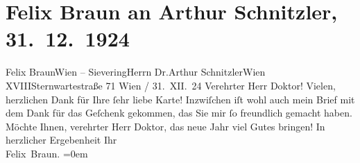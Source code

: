 

         
         \renewcommand{\erwaehntePersonen}{Personen: Felix Braun}
         \renewcommand{\erwaehnteOrte}{Orte: Sievering, Sternwartestraße, Wien, XVI., Ottakring, XVIII., Währing}
         \renewcommand{\erwaehnteWerke}{Werke: Fräulein Else}
               \section[Felix Braun an Arthur Schnitzler, 31. 12. 1924]{ Felix Braun an Arthur Schnitzler, 31. 12. 1924}\nopagebreak{}\rehead{ }\begin{ledgroupsized}[t]{13cm}\normalsize\beginnumbering \toendnotes[C]{\smallbreak\pagebreak[2]} 
\toendnotes[C]{\smallbreak}\pstart{}{\pb}Felix Braun\pend{}\pstart{}Wien – Sievering\pend{}{\bigskip}\pstart{}Herrn Dr.\pend{}\pstart{}Arthur Schnitzler\pend{}\pstart{}Wien XVIII\pend{}\pstart{}Sternwartestraße 71\pend{}{\bigskip}\pstart
           \centering{}{\pb}Wien / 31. XII. 24\pend
           \pstart{}Verehrter Herr Doktor!\pend\pstart
           Vielen, herzlichen Dank für Ihre ſehr liebe Karte! Inzwiſchen iſt wohl auch mein
               Brief mit dem Dank für das Geſchenk gekommen, das Sie mir ſo freundlich gemacht haben. Möchte Ihnen,
               verehrter Herr Doktor, das neue Jahr viel Gutes bringen!\pend
           \pstart
           In herzlicher Ergebenheit Ihr{\\[\baselineskip]}\spacefill\mbox{Felix Braun.}\pend
           \leftskip=0em{}
         
         \endnumbering{}\end{ledgroupsized}  \newcommand{\dateiname}{L02428}\newcommand{\titel}{Felix Braun an Arthur Schnitzler, 31. 12. 1924}\newcommand{\editorInnen}{Martin Anton Müller und Gerd-Hermann Susen}
      